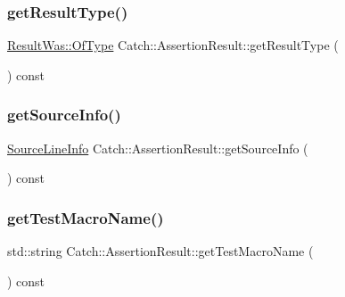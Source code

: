 \hypertarget{class_catch_1_1_assertion_result_ac810750194e1722489d2fd16e8c6a4a8}{}\label{class_catch_1_1_assertion_result_ac810750194e1722489d2fd16e8c6a4a8} 
\subsubsection{\texorpdfstring{get\+Result\+Type()}{getResultType()}}
{\footnotesize\ttfamily \hyperlink{struct_catch_1_1_result_was_a624e1ee3661fcf6094ceef1f654601ef}{Result\+Was\+::\+Of\+Type} Catch\+::\+Assertion\+Result\+::get\+Result\+Type (\begin{DoxyParamCaption}{ }\end{DoxyParamCaption}) const}

\hypertarget{class_catch_1_1_assertion_result_aa4d3fdbfe276a69a035762dbb790800f}{}\label{class_catch_1_1_assertion_result_aa4d3fdbfe276a69a035762dbb790800f} 
\subsubsection{\texorpdfstring{get\+Source\+Info()}{getSourceInfo()}}
{\footnotesize\ttfamily \hyperlink{struct_catch_1_1_source_line_info}{Source\+Line\+Info} Catch\+::\+Assertion\+Result\+::get\+Source\+Info (\begin{DoxyParamCaption}{ }\end{DoxyParamCaption}) const}

\hypertarget{class_catch_1_1_assertion_result_aaefd9a0384282fd08a4a72aa19bd0628}{}\label{class_catch_1_1_assertion_result_aaefd9a0384282fd08a4a72aa19bd0628} 
\subsubsection{\texorpdfstring{get\+Test\+Macro\+Name()}{getTestMacroName()}}
{\footnotesize\ttfamily std\+::string Catch\+::\+Assertion\+Result\+::get\+Test\+Macro\+Name (\begin{DoxyParamCaption}{ }\end{DoxyParamCaption}) const}

